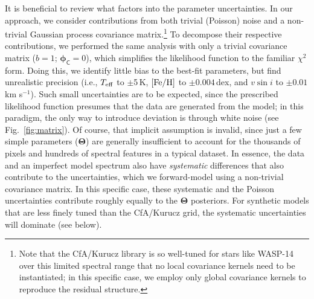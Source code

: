 \documentclass[iop,floatfix]{emulateapj}
\newcommand{\vT}{ {\bm \Theta}}
\newcommand{\vp}{ {\bm \phi}}
\newcommand{\cov}{ \vp_{\mathsf{C}}}
\newcommand{\todo}[1]{ \textcolor{blue}{\\TODO: #1}}
\begin{document}

It is beneficial to review what factors into the parameter uncertainties.  In our approach, we 
consider contributions from both trivial (Poisson) noise and a non-trivial Gaussian process 
covariance matrix.\footnote{Note that the {\sc CfA/Kurucz} library is so well-tuned for stars like 
WASP-14 over this limited spectral range that no local covariance kernels need to be instantiated; 
in this specific case, we employ only global covariance kernels to reproduce the residual 
structure.} To decompose their respective contributions, we performed the same analysis with only a 
trivial covariance matrix ($b = 1$; $\cov = 0$), which simplifies the likelihood function to the 
familiar $\chi^2$ form.  Doing this, we identify little bias to the best-fit parameters, but find 
unrealistic precision (i.e., $T_{\rm eff}$ to $\pm$5\,K, $[{\rm Fe/H}]$ to $\pm0.004$\,dex, and $v 
\sin i$ to $\pm0.01$\,km s$^{-1}$).  Such small uncertainties are to be expected, since the 
prescribed likelihood function presumes that the data are generated from the model; in this 
paradigm, the only way to introduce deviation is through white noise (see Fig.~\ref{fig:matrix}).  
Of course, that implicit assumption is invalid, since just a few simple parameters ($\vT$) are 
generally insufficient to account for the thousands of pixels and hundreds of spectral features in 
a typical dataset.  In essence, the data and an imperfect model spectrum also have {\it systematic} 
differences that also contribute to the uncertainties, which we forward-model using a non-trivial 
covariance matrix.  In this specific case, these systematic and the Poisson uncertainties 
contribute roughly equally to the $\vT$ posteriors.  For synthetic models that are less finely 
tuned than the {\sc CfA/Kurucz} grid, the systematic uncertainties will dominate (see below). 
\end{document}
